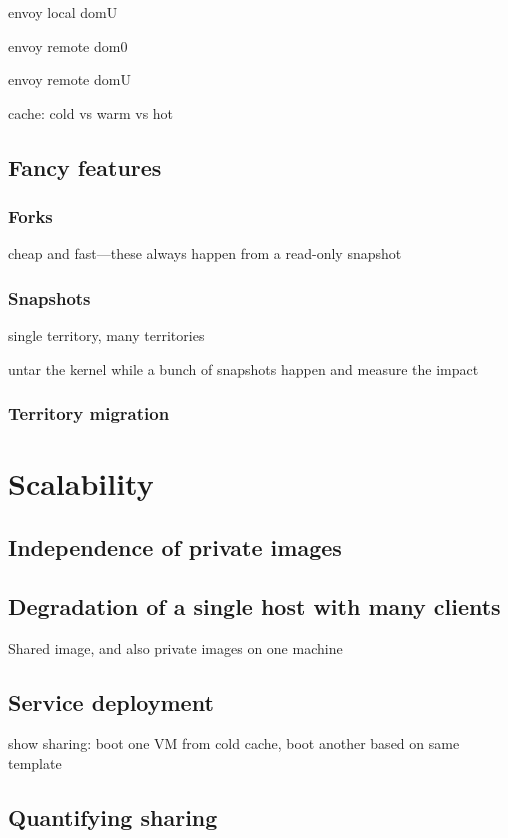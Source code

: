 envoy local domU

envoy remote dom0

envoy remote domU

cache: cold vs warm vs hot

\subsection{Fancy features}
\subsubsection{Forks}

cheap and fast---these always happen from a read-only snapshot

\subsubsection{Snapshots}

single territory, many territories

untar the kernel while a bunch of snapshots happen and measure the impact

\subsubsection{Territory migration}

\section{Scalability}
\subsection{Independence of private images}
\subsection{Degradation of a single host with many clients}
Shared image, and also private images on one machine

\subsection{Service deployment}
show sharing: boot one VM from cold cache, boot another based on same template

\subsection{Quantifying sharing}

